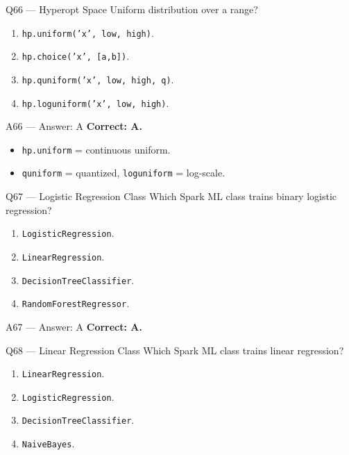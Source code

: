 \documentclass[aspectratio=169,10pt]{beamer}
\begin{document}
	\begin{frame}{Q66 — Hyperopt Space}
		Uniform distribution over a range?
		\begin{enumerate}[label=\Alph*.]
			\item \texttt{hp.uniform('x', low, high)}.
			\item \texttt{hp.choice('x', [a,b])}.
			\item \texttt{hp.quniform('x', low, high, q)}.
			\item \texttt{hp.loguniform('x', low, high)}.
		\end{enumerate}
	\end{frame}
	
	\begin{frame}{A66 — Answer: A}
		\textbf{Correct: A.}
		\begin{itemize}
			\item \texttt{hp.uniform} = continuous uniform.
			\item \texttt{quniform} = quantized, \texttt{loguniform} = log-scale.
		\end{itemize}
	\end{frame}
	
	\begin{frame}{Q67 — Logistic Regression Class}
		Which Spark ML class trains binary logistic regression?
		\begin{enumerate}[label=\Alph*.]
			\item \texttt{LogisticRegression}.
			\item \texttt{LinearRegression}.
			\item \texttt{DecisionTreeClassifier}.
			\item \texttt{RandomForestRegressor}.
		\end{enumerate}
	\end{frame}
	
	\begin{frame}{A67 — Answer: A}
		\textbf{Correct: A.}
	\end{frame}
	
	\begin{frame}{Q68 — Linear Regression Class}
		Which Spark ML class trains linear regression?
		\begin{enumerate}[label=\Alph*.]
			\item \texttt{LinearRegression}.
			\item \texttt{LogisticRegression}.
			\item \texttt{DecisionTreeClassifier}.
			\item \texttt{NaiveBayes}.
		\end{enumerate}
	\end{frame}
	
\end{document}

